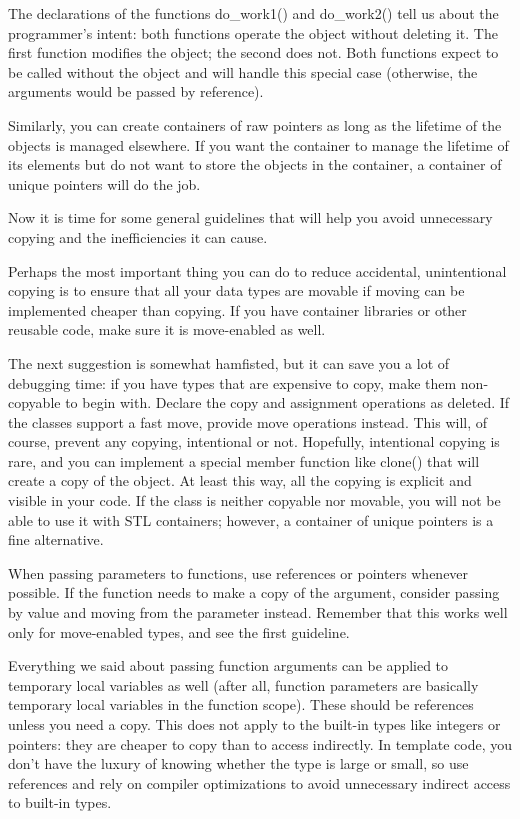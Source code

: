 The declarations of the functions do\_work1() and do\_work2() tell us about the programmer’s intent: both functions operate the object without deleting it. The first function modifies the object; the second does not. Both functions expect to be called without the object and will handle this special case (otherwise, the arguments would be passed by reference). 

Similarly, you can create containers of raw pointers as long as the lifetime of the objects is managed elsewhere. If you want the container to manage the lifetime of its elements but do not want to store the objects in the container, a container of unique pointers will do the job. 

Now it is time for some general guidelines that will help you avoid unnecessary copying and the inefficiencies it can cause.


Perhaps the most important thing you can do to reduce accidental, unintentional copying is to ensure that all your data types are movable if moving can be implemented cheaper than copying. If you have container libraries or other reusable code, make sure it is move-enabled as well. 

The next suggestion is somewhat hamfisted, but it can save you a lot of debugging time: if you have types that are expensive to copy, make them non-copyable to begin with. Declare the copy and assignment operations as deleted. If the classes support a fast move, provide move operations instead. This will, of course, prevent any copying, intentional or not. Hopefully, intentional copying is rare, and you can implement a special member function like clone() that will create a copy of the object. At least this way, all the copying is explicit and visible in your code. If the class is neither copyable nor movable, you will not be able to use it with STL containers; however, a container of unique pointers is a fine alternative. 

When passing parameters to functions, use references or pointers whenever possible. If the function needs to make a copy of the argument, consider passing by value and moving from the parameter instead. Remember that this works well only for move-enabled types, and see the first guideline.

Everything we said about passing function arguments can be applied to temporary local variables as well (after all, function parameters are basically temporary local variables in the function scope). These should be references unless you need a copy. This does not apply to the built-in types like integers or pointers: they are cheaper to copy than to access indirectly. In template code, you don’t have the luxury of knowing whether the type is large or small, so use references and rely on compiler optimizations to avoid unnecessary indirect access to built-in types.


